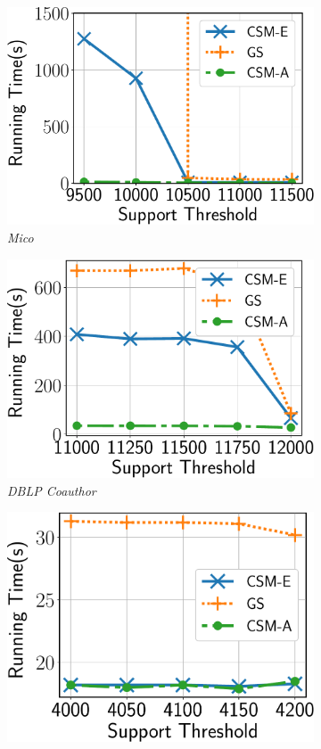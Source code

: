 \begin{figure}[tb!]
\begin{subfigure}[b]{0.21\textwidth}
		\includegraphics[scale=0.22]{img2/mico/mico_h1.pdf}
		\caption{{\em Mico}}
		\label{fig:mico_h1}
	\end{subfigure}%
	\begin{subfigure}[b]{0.21\textwidth}
		\includegraphics[scale=0.22]{img2/coauthordblp/coauthordblp_h1.pdf}
		\caption{{\em DBLP Coauthor}}
		\label{fig:coauthordblp_h1}
	\end{subfigure}%
	\begin{subfigure}[b]{0.21\textwidth}
		\includegraphics[scale=0.22]{img2/citationdblp/citationdblp_h1.pdf}

\end{subfigure}
\end{figure}
